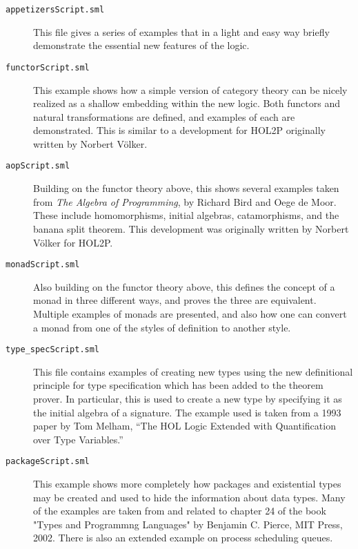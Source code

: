 \begin{description}

\item [\tt appetizersScript.sml]

  This file gives a series of examples that in a light and easy way 
  briefly demonstrate the essential new features of the \HOLW{} logic.

\item [\tt functorScript.sml]

  This example shows how a simple version of category theory can
  be nicely realized as a shallow embedding within the new logic.
  Both functors and natural transformations are defined, and
  examples of each are demonstrated. This is similar to a development
  for HOL2P originally written by Norbert V\"{o}lker.

\item [\tt aopScript.sml]

  Building on the functor theory above, this shows several examples
  taken from {\it The Algebra of Programming}, by Richard Bird and Oege de Moor.
  These include homomorphisms, initial algebras, catamorphisms, and
  the banana split theorem.  This development was originally written
  by Norbert V\"{o}lker for HOL2P.

\item [\tt monadScript.sml]

  Also building on the functor theory above, this defines the concept
  of a monad in three different ways, and proves the three are equivalent.
  Multiple examples of monads are presented, and also how one can convert
  a monad from one of the styles of definition to another style.

\item [\tt type\_specScript.sml]

  This file contains examples of creating new types using the new definitional
  principle for type specification which has been added to the \HOLW{} theorem
  prover. In particular, this is used to create a new type by specifying it as
  the initial algebra of a signature. The example used is taken from a 1993
  paper by Tom Melham, ``The HOL Logic Extended with Quantification over Type
  Variables.''

\item [\tt packageScript.sml]

  This example shows more completely how packages and existential types
  may be created and used to hide the information about data types.
  Many of the examples are taken from and related to chapter 24 of the book
  "Types and Programmng Languages" by Benjamin C. Pierce, MIT Press, 2002.
  There is also an extended example on process scheduling queues.


\end{description}
